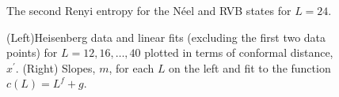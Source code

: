 \documentclass[prl,aps,twocolumn,floatfix,amsmath,amssymb,superscriptaddress,tightenlines]{revtex4}
\begin{document}

 \begin{figure}[ht]
   \begin{center}
   \end{center}
   \caption{ The second Renyi entropy for the N\'eel and RVB states for $L=24$.
   \label{fig:heis_bow} }
 \end{figure}

 \begin{figure}[ht]
   \begin{center}
   \end{center}
   \caption{(Left)Heisenberg data and linear fits (excluding the first two data points) for $L=12,16,\dots,40$ plotted in terms of conformal distance, $x^\prime$.
   (Right) Slopes, $m$, for each $L$ on the left {\color{red} and fit to the function $c(L)=L^f+g$}. 
   }
   \label{fig:heis_lines}
 \end{figure}
\end{document}
